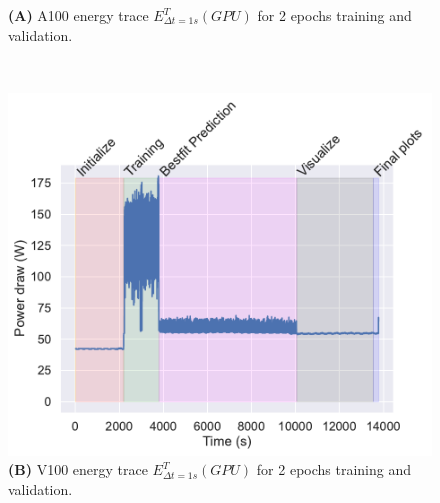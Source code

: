 \documentclass[utf8]{FrontiersinVancouver} %
\begin{document}
\begin{figure}[htb]
{\begin{center}
\begin{minipage}[b]{0.43\textwidth}
        {\bf (A)} A100 energy trace $E^T_{\Delta t=1s}(GPU)$ for 2 epochs training and validation.
    \end{minipage}
     \ \
     \begin{minipage}[b]{0.43\textwidth}
        \includegraphics[width=1.0\linewidth]{images/v100-shaded-energy-2-epochs}
        {\bf (B)}  V100 energy trace $E^T_{\Delta t=1s}(GPU)$ for 2 epochs training and validation.
     \end{minipage}


\end{center}}
\end{figure}
\end{document}
